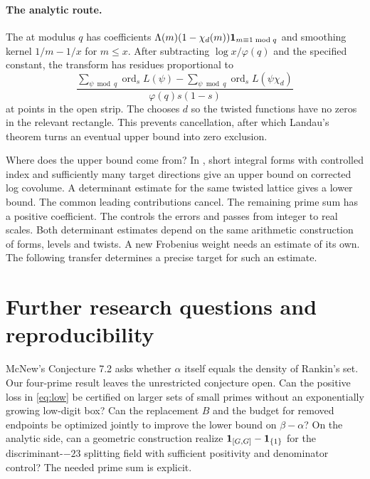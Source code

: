 \documentclass[11pt]{article}
\begin{document}
\paragraph{The analytic route.}
The  at modulus $q$ has coefficients $\Lambda(m)(1-\chi_d(m))\mathbf 1_{m\equiv1\bmod q}$ and smoothing kernel $1/m-1/x$ for $m\le x$. After subtracting $\log x/\varphi(q)$ and the specified constant, the transform has residues proportional to
\[
 \frac{\sum_{\psi\bmod q}\operatorname{ord}_s L(\psi)
       -\sum_{\psi\bmod q}\operatorname{ord}_s L(\psi\chi_d)}
      {\varphi(q)s(1-s)}
\]
at points in the open strip. The  chooses $d$ so the twisted functions have no zeros in the relevant rectangle. This prevents cancellation, after which Landau's theorem turns an eventual upper bound into zero exclusion.
 
Where does the upper bound come from? In , short integral forms with controlled index and sufficiently many target directions give an upper bound on corrected log covolume. A determinant estimate for the same twisted lattice gives a lower bound. The common leading contributions cancel. The remaining prime sum has a positive coefficient. The  controls the errors and passes from integer to real scales. Both determinant estimates depend on the same arithmetic construction of forms, levels and twists. A new Frobenius weight needs an estimate of its own. The following transfer determines a precise target for such an estimate.

\appendix

\section{Further research questions and reproducibility}
McNew's Conjecture 7.2 asks whether $\alpha$ itself equals the density of Rankin's set. Our four-prime result leaves the unrestricted conjecture open. Can the positive loss in \eqref{eq:low} be certified on larger sets of small primes without an exponentially growing low-digit box? Can the replacement $B$ and the budget for removed endpoints be optimized jointly to improve the lower bound on $\beta-\alpha$? On the analytic side, can a geometric construction realize $\mathbf 1_{[G,G]}-\mathbf 1_{\{1\}}$ for the discriminant-$-23$ splitting field with sufficient positivity and denominator control? The needed prime sum is explicit.
\end{document}
